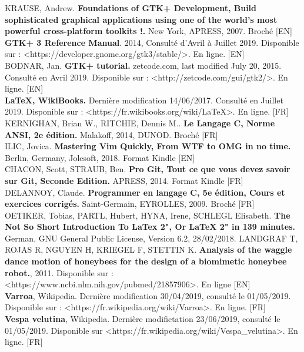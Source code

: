 \documentclass[11pt,french,a4paper]{report}
\begin{document}
KRAUSE, Andrew. \textbf{Foundations of GTK+ Development, Build sophisticated graphical applications using one of the world's most powerful cross-platform toolkits !.} New York, APRESS, 2007. Broché [EN] \\
\textbf{GTK+ 3 Reference Manual}. 2014, Consulté d'Avril à Juillet 2019. Disponible sur : <https://developer.gnome.org/gtk3/stable/>. En ligne. [EN] \\
BODNAR, Jan. \textbf{GTK+ tutorial.} zetcode.com, last modified July 20, 2015. Consulté en Avril 2019. Disponible sur : <http://zetcode.com/gui/gtk2/>. En ligne. [EN] \\
\textbf{LaTeX, WikiBooks.} Dernière modification 14/06/2017. Consulté en Juillet 2019. Disponible sur : <https://fr.wikibooks.org/wiki/LaTeX>. En ligne. [FR] \\
KERNIGHAN, Brian W., RITCHIE, Dennis M.. \textbf{Le Langage C, Norme ANSI, 2e édition.} Malakoff, 2014, DUNOD. Broché [FR] \\
ILIC, Jovica. \textbf{Mastering Vim Quickly, From WTF to OMG in no time.} Berlin, Germany, Jolesoft, 2018. Format Kindle [EN] \\
CHACON, Scott, STRAUB, Ben. \textbf{Pro Git, Tout ce que vous devez savoir sur Git, Seconde Edition.} APRESS, 2014. Format Kindle [FR] \\
DELANNOY, Claude. \textbf{Programmer en langage C, 5e édition, Cours et exercices corrigés.} Saint-Germain, EYROLLES, 2009. Broché [FR] \\
OETIKER, Tobias, PARTL, Hubert, HYNA, Irene, SCHLEGL Elisabeth. \textbf{The Not So Short Introduction To LaTex 2", Or LaTeX 2" in 139 minutes.} German, GNU General Public License, Version 6.2, 28/02/2018.
LANDGRAF T, ROJAS R, NGUYEN H, KRIEGEL F, STETTIN K. \textbf{Analysis of the waggle dance motion of honeybees for the design of a biomimetic honeybee robot.}, 2011. Disponible sur : <https://www.ncbi.nlm.nih.gov/pubmed/21857906>. En ligne [EN] \\
\textbf{Varroa}, Wikipedia. Dernière modification 30/04/2019, consulté le 01/05/2019. Disponible sur : <https://fr.wikipedia.org/wiki/Varroa>. En ligne. [FR]\\
\textbf{Vespa velutina}, Wikipedia. Dernière modifictation 23/06/2019, consulté le 01/05/2019. Disponible sur <https://fr.wikipedia.org/wiki/Vespa\_velutina>. En ligne. [FR] \\
\end{document}
